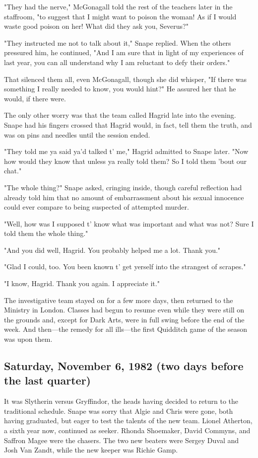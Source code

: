 "They had the nerve," McGonagall told the rest of the teachers later in the staffroom, "to suggest that I might want to poison the woman! As if I would waste good poison on her! What did they ask you, Severus?"

"They instructed me not to talk about it," Snape replied. When the others pressured him, he continued, "And I am sure that in light of my experiences of last year, you can all understand why I am reluctant to defy their orders."

That silenced them all, even McGonagall, though she did whisper, "If there was something I really needed to know, you would hint{\el}?" He assured her that he would, if there were.

The only other worry was that the team called Hagrid late into the evening. Snape had his fingers crossed that Hagrid would, in fact, tell them the truth, and was on pins and needles until the session ended.

"They told me ya said ya'd talked t' me," Hagrid admitted to Snape later. "Now how would they know that unless ya really told them? So I told them 'bout our chat."

"The whole thing?" Snape asked, cringing inside, though careful reflection had already told him that no amount of embarrassment about his sexual innocence could ever compare to being suspected of attempted murder.

"Well, how was I supposed t' know what was important and what was not? Sure I told them the whole thing."

"And you did well, Hagrid. You probably helped me a lot. Thank you."

"Glad I could, too. You been known t' get yerself into the strangest of scrapes."

"I know, Hagrid. Thank you again. I appreciate it."

The investigative team stayed on for a few more days, then returned to the Ministry in London. Classes had begun to resume even while they were still on the grounds and, except for Dark Arts, were in full swing before the end of the week. And then—the remedy for all ills—the first Quidditch game of the season was upon them.

\subsection{Saturday, November 6, 1982 (two days before the last quarter)}

It was Slytherin versus Gryffindor, the heads having decided to return to the traditional schedule. Snape was sorry that Algie and Chris were gone, both having graduated, but eager to test the talents of the new team. Lionel Atherton, a sixth year now, continued as seeker. Rhonda Shoemaker, David Commyns, and Saffron Magee were the chasers. The two new beaters were Sergey Duval and Josh Van Zandt, while the new keeper was Richie Gamp.

